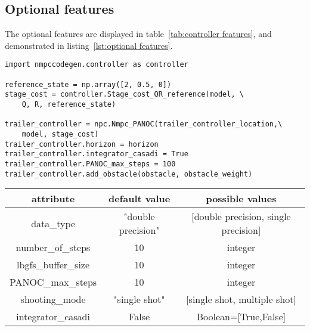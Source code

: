 \subsection{Optional features}
The optional features are displayed in table~\ref{tab:controller features}, and demonstrated in listing~\ref{lst:optional features}.

\begin{lstlisting}[caption={Optional features},captionpos=b,label={lst:optional features}]
import nmpccodegen.controller as controller

reference_state = np.array([2, 0.5, 0])
stage_cost = controller.Stage_cost_QR_reference(model, \
	Q, R, reference_state)

trailer_controller = npc.Nmpc_PANOC(trailer_controller_location,\
	model, stage_cost)
trailer_controller.horizon = horizon
trailer_controller.integrator_casadi = True
trailer_controller.PANOC_max_steps = 100
trailer_controller.add_obstacle(obstacle, obstacle_weight)
\end{lstlisting}

\begin{center}
	\begin{tabular}{ |c|c|c| } 
		\hline
		attribute & default value & possible values \\ 
		\hline
		data\_type & "double precision" & [double precision, single precision]\\ 
		\hline
		number\_of\_steps & 10 & integer\\ 
		\hline
		lbgfs\_buffer\_size &  10 & integer\\ 
		\hline
		PANOC\_max\_steps &  10 & integer\\ 
		\hline
		shooting\_mode & "single shot" & [single shot, multiple shot] \\ 
		\hline
		integrator\_casadi &  False & Boolean=[True,False]\\ 
		\hline
	\end{tabular}
	 \label{tab:controller features} 
\end{center}

